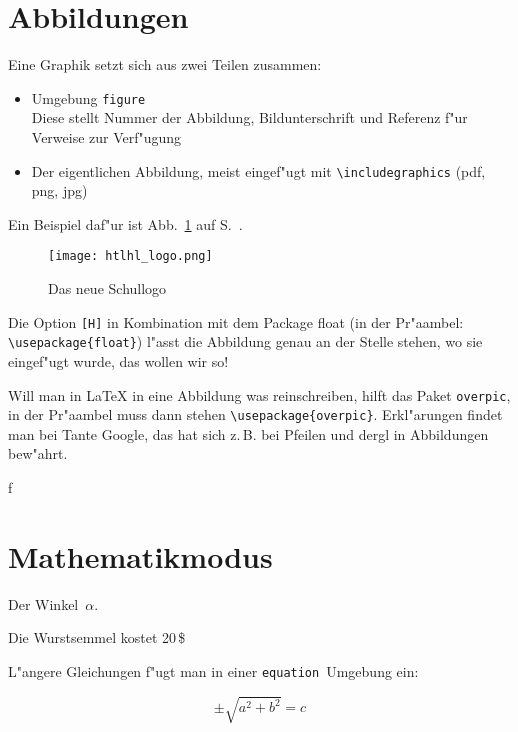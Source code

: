 		\section{Abbildungen}
		\label{kap:abbildungen}
		Eine Graphik setzt sich aus zwei Teilen zusammen:

		\begin{itemize}
			\item Umgebung \verb|figure|\\
			      Diese stellt Nummer der Abbildung, Bildunterschrift und Referenz f"ur Verweise zur Verf"ugung
			\item Der eigentlichen Abbildung, meist eingef"ugt mit \verb|\includegraphics| (pdf, png, jpg)
		\end{itemize}

		Ein Beispiel daf"ur ist Abb.~\ref{fig:HTL_Logo_neu} auf S.~\pageref{fig:HTL_Logo_neu}.






		\begin{figure}[H]
			\centering
			\texttt{[image: htlhl\_logo.png]}
            \caption{Das neue Schullogo \cite{htl_logo}}
			\label{fig:HTL_Logo_neu}
		\end{figure}






		Die Option \verb|[H]| in Kombination mit dem Package float (in der Pr"aambel: \verb|\usepackage{float}|) l"asst die Abbildung genau an der Stelle stehen, wo sie eingef"ugt wurde, das wollen wir so!

		Will man in \LaTeX{} in eine Abbildung was reinschreiben, hilft das Paket \verb|overpic|, in der Pr"aambel muss dann stehen \verb|\usepackage{overpic}|. Erkl"arungen findet man bei Tante Google, das hat sich z.\,B. bei Pfeilen und dergl in Abbildungen bew"ahrt.


		\pagebreak
f		\section{Mathematikmodus}

		Der Winkel~$\alpha$.

		Die Wurstsemmel kostet 20\,\$

		L"angere Gleichungen f"ugt man in einer \verb|equation|~Umgebung ein:

		\begin{equation}
			\pm\sqrt{a^2 + b^2}=c
			\label{equ:pythagoras}
		\end{equation}

